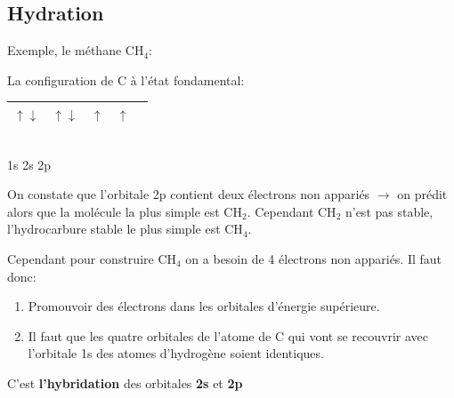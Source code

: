 \documentclass[10pt,a4paper]{book}
\begin{document}
\subsection{Hydration}
Exemple, le méthane CH$_4$:
\begin{center}
La configuration de C à l'état fondamental: \\ \vspace{0.5cm}
\begin{tabular}{| c | c | c | c | c |}
\hline
$\uparrow\downarrow$ & $\uparrow\downarrow$ & $\uparrow$ & $\uparrow$  & \: \\
\hline
\end{tabular}\\
1s \quad 2s \quad \qquad 2p
\end{center}
\par On constate que l'orbitale 2p contient deux électrons non appariés $\rightarrow$ on prédit alors que la molécule la plus simple est CH$_2$. Cependant CH$_2$ n'est pas stable, l'hydrocarbure stable le plus simple est CH$_4$. \par
Cependant pour construire CH$_4$ on a besoin de 4 électrons non appariés. Il faut donc:
\begin{enumerate}
\item Promouvoir des électrons dans les orbitales d'énergie supérieure.
\item Il faut que les quatre orbitales de l’atome de C qui vont se recouvrir avec l’orbitale 1s des atomes d’hydrogène soient identiques.
\end{enumerate}
C'est \textbf{l'hybridation} des orbitales \textbf{2s} et \textbf{2p} 
\end{document}
